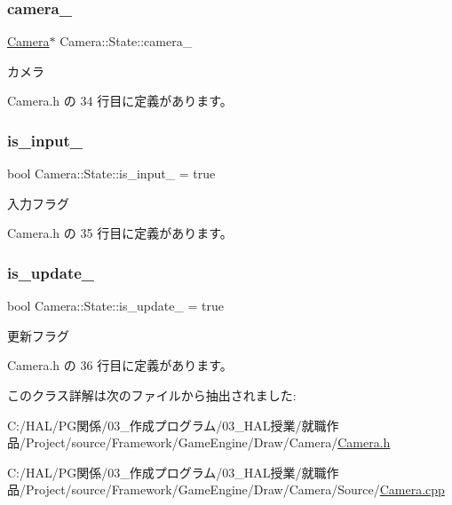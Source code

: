 \subsubsection{\texorpdfstring{camera\+\_\+}{camera\_}}
{\footnotesize\ttfamily \mbox{\hyperlink{class_camera}{Camera}}$\ast$ Camera\+::\+State\+::camera\+\_\+\hspace{0.3cm}{\ttfamily [private]}}



カメラ 



 Camera.\+h の 34 行目に定義があります。

\mbox{\label{class_camera_1_1_state_a4cdcb987af52635b6d6c81559ab03ba6}} 
\subsubsection{\texorpdfstring{is\+\_\+input\+\_\+}{is\_input\_}}
{\footnotesize\ttfamily bool Camera\+::\+State\+::is\+\_\+input\+\_\+ = true\hspace{0.3cm}{\ttfamily [private]}}



入力フラグ 



 Camera.\+h の 35 行目に定義があります。

\mbox{\label{class_camera_1_1_state_aa54c42af6127f83f00845788e32e575a}} 
\subsubsection{\texorpdfstring{is\+\_\+update\+\_\+}{is\_update\_}}
{\footnotesize\ttfamily bool Camera\+::\+State\+::is\+\_\+update\+\_\+ = true\hspace{0.3cm}{\ttfamily [private]}}



更新フラグ 



 Camera.\+h の 36 行目に定義があります。



このクラス詳解は次のファイルから抽出されました\+:\begin{DoxyCompactItemize}
\item 
C\+:/\+H\+A\+L/\+P\+G関係/03\+\_\+作成プログラム/03\+\_\+\+H\+A\+L授業/就職作品/\+Project/source/\+Framework/\+Game\+Engine/\+Draw/\+Camera/\mbox{\hyperlink{_camera_8h}{Camera.\+h}}\item 
C\+:/\+H\+A\+L/\+P\+G関係/03\+\_\+作成プログラム/03\+\_\+\+H\+A\+L授業/就職作品/\+Project/source/\+Framework/\+Game\+Engine/\+Draw/\+Camera/\+Source/\mbox{\hyperlink{_camera_8cpp}{Camera.\+cpp}}\end{DoxyCompactItemize}
